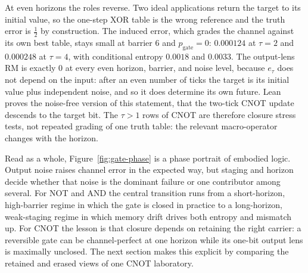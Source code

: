 At even horizons the roles reverse. Two ideal applications return the target to its initial value, so the one-step XOR table is the wrong reference and the truth error is \(\tfrac12\) by construction. The induced error, which grades the channel against its own best table, stays small at barrier \(6\) and \(p_{\mathrm{gate}}=0\): \(0.000124\) at \(\tau=2\) and \(0.000248\) at \(\tau=4\), with conditional entropy \(0.0018\) and \(0.0033\). The output-lens RM is exactly \(0\) at every even horizon, barrier, and noise level, because \(e_\tau\) does not depend on the input: after an even number of ticks the target is its initial value plus independent noise, and so it does determine its own future. Lean proves the noise-free version of this statement, that the two-tick CNOT update descends to the target bit. The \(\tau>1\) rows of CNOT are therefore closure stress tests, not repeated grading of one truth table: the relevant macro-operator changes with the horizon.

Read as a whole, Figure~\ref{fig:gate-phase} is a phase portrait of embodied logic. Output noise raises channel error in the expected way, but staging and horizon decide whether that noise is the dominant failure or one contributor among several. For NOT and AND the central transition runs from a short-horizon, high-barrier regime in which the gate is closed in practice to a long-horizon, weak-staging regime in which memory drift drives both entropy and mismatch up. For CNOT the lesson is that closure depends on retaining the right carrier: a reversible gate can be channel-perfect at one horizon while its one-bit output lens is maximally unclosed. The next section makes this explicit by comparing the retained and erased views of one CNOT laboratory.

